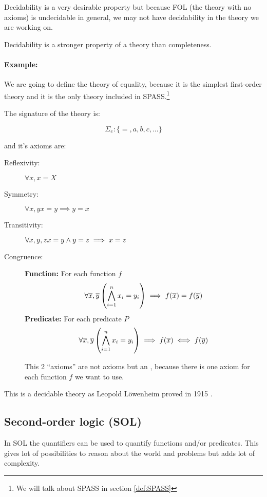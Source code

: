 Decidability is a very desirable property but because \gls{FOL} (the theory with no axioms) is undecidable in general, we may not have decidability in the theory we are working on.

Decidability is a stronger property of a theory than completeness. 


\paragraph{Example:}

\label{theory:equality}
We are going to define the theory of equality, because it is the simplest first-order theory and it is the only theory included in SPASS.\footnote{We will talk about SPASS in section \ref{def:SPASS}}

The signature of the theory is:

\[\Sigma_e:\{=,a,b,c,...\}\]

and it's axioms are:

\begin{description}
	\item[Reflexivity:	] $\forall x, x=X$
	\item[Symmetry:	] $\forall x,y x=y \implies y=x$
	\item[Transitivity:	] $\forall x,y,z x=y \wedge y=z \implies x=z$
	\item[Congruence:	]
	\subitem \textbf{Function:} For each function $f$
	\[\forall \overline{x},\overline{y} \left( \bigwedge_{i=1}^n x_i = y_i \right) \implies f(\overline{x}) = f(\overline{y})\]
	\subitem \textbf{Predicate:} For each predicate $P$
	\[\forall \overline{x},\overline{y} \left( \bigwedge_{i=1}^n x_i = y_i \right) \implies f(\overline{x}) \iff f(\overline{y})\]

	This 2 ``axioms'' are not axioms but an , because there is one axiom for each function $f$ we want to use.
\end{description}

This is a decidable theory as Leopold Löwenheim proved in 1915 \cite{EqualityIsDecidable}.


\subsection{Second-order logic (SOL)}

In \gls{SOL} the quantifiers can be used to quantify functions and/or predicates. This gives lot of possibilities to reason about the world and problems but adds lot of complexity.

